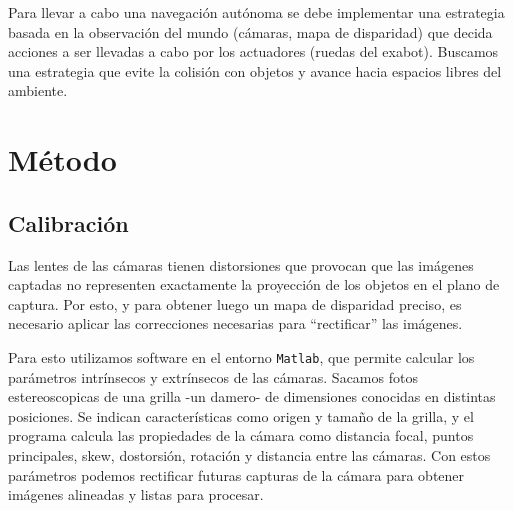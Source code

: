 \documentclass[journal,a4paper]{IEEEtran}
\begin{document}
Para llevar a cabo una navegación autónoma se debe implementar una estrategia basada en la observación del mundo (cámaras, mapa de disparidad) que decida acciones a ser llevadas a cabo por los actuadores (ruedas del exabot).
Buscamos una estrategia que evite la colisión con objetos y avance hacia espacios libres del ambiente.

\section{Método}
\subsection{Calibración}
Las lentes de las cámaras tienen distorsiones que provocan que las imágenes captadas no representen exactamente la proyección de los objetos en el plano de captura. Por esto, y para obtener luego un mapa de disparidad preciso, es necesario aplicar las correcciones necesarias para ``rectificar'' las imágenes.

Para esto utilizamos software en el entorno \texttt{Matlab}, que permite calcular los parámetros intrínsecos y extrínsecos de las cámaras. Sacamos fotos estereoscopicas de una grilla -un damero- de dimensiones conocidas en distintas posiciones. Se indican características como origen y tamaño de la grilla, y el programa calcula las propiedades de la cámara como distancia focal, puntos principales, skew, dostorsión, rotación y distancia entre las cámaras.
Con estos parámetros podemos rectificar futuras capturas de la cámara para obtener imágenes alineadas y listas para procesar.
\end{document}
